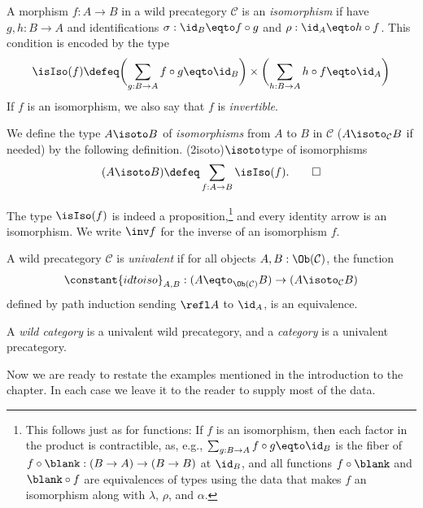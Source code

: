 \begin{definition}\label{def:iso-in-cat}
  A morphism $f : A \to B$ in a wild precategory $\mathcal{C}$ is an
  \emph{isomorphism}
  if have $g, h : B \to A$ and identifications
  $\sigma : \id_B \eqto f\circ g$ and $\rho : \id_A \eqto h\circ f$.
  This condition is encoded by the type
  \[
    \isIso(f) \defeq \biggl(\sum_{g:B\to A}f\circ g\eqto\id_B\biggr)
    \times\biggl(\sum_{h:B\to A}h\circ f\eqto\id_A\biggr)
  \]
  If $f$ is an isomorphism, we also say that $f$ is \emph{invertible}.

  We define the type $A \isoto B$ of \emph{isomorphisms} from $A$ to $B$
  in $\mathcal C$ ($A \isoto_{\mathcal C} B$ if needed)
  by the following definition.%
  \glossary(2isoto){$\protect\isoto$}{type of isomorphisms}
  \[
    (A \isoto B) \defeq \sum_{f:A\to B} \isIso(f).\qedhere
  \]
\end{definition}
The type $\isIso(f)$
is indeed a proposition,\footnote{%
  This follows just as for functions: If $f$ is an isomorphism,
  then each factor in the product is contractible, as, e.g.,
  $\sum_{g:B\to A}f\circ g\eqto\id_B$ is the fiber
  of $f\circ\blank : (B \to A) \to (B \to B)$
  at $\id_B$, and all functions $f\circ\blank$ and $\blank\circ f$
  are equivalences of types using the data that makes $f$ an isomorphism
  along with $\lambda$, $\rho$, and $\alpha$.}
and every identity arrow is an isomorphism.
We write $\inv f$ for the inverse of an isomorphism $f$.
\begin{definition}\label{def:univalent-cat}
  A wild precategory $\mathcal C$ is \emph{univalent} if
  for all objects $A,B : \Ob(\mathcal C)$, the function
  \[
    \constant{idtoiso}_{A,B} : (A \eqto_{\Ob(\mathcal C)} B) \to (A \isoto_{\mathcal C} B)
  \]
  defined by path induction sending $\refl A$ to $\id_A$,
  is an equivalence.
\end{definition}
\begin{definition}\label{def:category}
  A \emph{wild category} is a univalent wild precategory,
  and a \emph{category} is a univalent precategory.
\end{definition}
Now we are ready to restate the examples mentioned in the introduction to the chapter.
In each case we leave it to the reader to supply most of the data.
